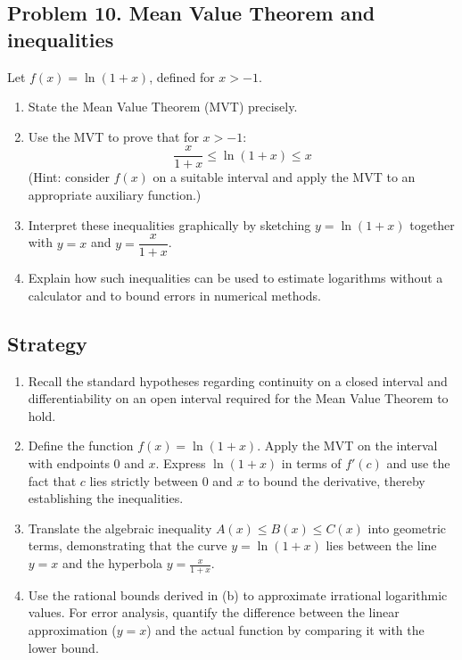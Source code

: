 \subsection{Problem 10. Mean Value Theorem and inequalities}
Let $f(x)=\ln(1+x)$, defined for $x>-1$.

\begin{enumerate}[label=(\alph*)]
    \item State the Mean Value Theorem (MVT) precisely.
    \item Use the MVT to prove that for $x>-1$:
    \[ \frac{x}{1+x} \le \ln(1+x) \le x \]
    (Hint: consider $f(x)$ on a suitable interval and apply the MVT to an appropriate auxiliary function.)
    \item Interpret these inequalities graphically by sketching $y=\ln(1+x)$ together with $y=x$ and $y=\dfrac{x}{1+x}$.
    \item Explain how such inequalities can be used to estimate logarithms without a calculator and to bound errors in numerical methods.
\end{enumerate}

\subsection*{Strategy}
\begin{enumerate}[label=(\alph*)]
    \item Recall the standard hypotheses regarding continuity on a closed interval and differentiability on an open interval required for the Mean Value Theorem to hold.
    
    \item Define the function $f(x) = \ln(1+x)$. Apply the MVT on the interval with endpoints $0$ and $x$. Express $\ln(1+x)$ in terms of $f'(c)$ and use the fact that $c$ lies strictly between $0$ and $x$ to bound the derivative, thereby establishing the inequalities.
    
    \item Translate the algebraic inequality $A(x) \le B(x) \le C(x)$ into geometric terms, demonstrating that the curve $y = \ln(1+x)$ lies between the line $y=x$ and the hyperbola $y = \frac{x}{1+x}$.
    
    \item Use the rational bounds derived in (b) to approximate irrational logarithmic values. For error analysis, quantify the difference between the linear approximation ($y=x$) and the actual function by comparing it with the lower bound.
\end{enumerate}
